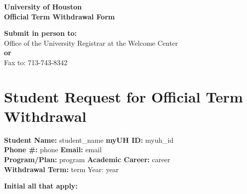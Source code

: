 \documentclass[12pt]{article}
\begin{document}
\begin{center}
    \textbf{\Large University of Houston\\ Official Term Withdrawal Form}
\end{center}

\vspace{1em}

\noindent\textbf{Submit in person to:} \\
Office of the University Registrar at the Welcome Center \\
\textbf{or} \\
Fax to: 713-743-8342

\vspace{1.5em}

\section*{Student Request for Official Term Withdrawal}

\begin{flushleft}
\textbf{Student Name:} {{ student_name }} \hfill \textbf{myUH ID:} {{ myuh_id }} \\
\textbf{Phone \#:} {{ phone }} \hfill \textbf{Email:} {{ email }} \\
\textbf{Program/Plan:} {{ program }} \hfill \textbf{Academic Career:} {{ career }} \\
\textbf{Withdrawal Term:} {{ term }} \quad Year: {{ year }}
\end{flushleft}

\vspace{1em}

\noindent\textbf{Initial all that apply:}
\end{document}
